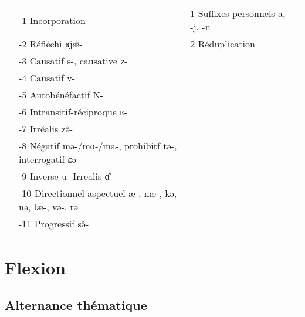\documentclass[11pt, a4paper]{book}              %
\newcommand{\ipa}[1]{{\phon \mbox{#1}}} %
\begin{document}
\begin{table}[H]
{\begin{tabular}{rrrrrrrrrrrrrrrrr}
 	          & \multicolumn{11}{l}{-1 Incorporation}                                                 & \multicolumn{4}{l}{1 Suffixes personnels a, -j, -n} &  \\
 	          & \multicolumn{11}{l}{-2 Réfléchi \ipa{ʁjæ̂-} }                                               & \multicolumn{4}{l}{2 Réduplication} &  \\
 	          & \multicolumn{11}{l}{-3 Causatif \ipa{s-}, causative \ipa{z-} }                                                 & \multicolumn{4}{l}{}          &  \\
 	          & \multicolumn{11}{l}{-4 Causatif \ipa{v-} }                                                 & \multicolumn{4}{l}{}          &  \\
 	          & \multicolumn{11}{l}{-5 Autobénéfactif \ipa{N-} }                                           & \multicolumn{4}{l}{}          &  \\
 	          & \multicolumn{11}{l}{-6 Intransitif-réciproque \ipa{ʁ-} }                                    & \multicolumn{4}{l}{}          &  \\
 	          & \multicolumn{11}{l}{-7 Irréalis \ipa{zə̂-}}                                                  & \multicolumn{4}{l}{}          &  \\
 	          & \multicolumn{11}{l}{-8 Négatif \ipa{mə-}/\ipa{mɑ-}/\ipa{ma-}, prohibitf \ipa{tə-}, interrogatif \ipa{ɕə}}       & \multicolumn{4}{r}{}          &  \\
 	          & \multicolumn{11}{l}{-9 Inverse \ipa{u-} Irrealis \ipa{ɑ̂-}}                                       & \multicolumn{4}{r}{}          &  \\
 	          & \multicolumn{11}{l}{-10 Directionnel-aspectuel \ipa{æ-}, \ipa{næ-}, \ipa{kə}, \ipa{nə}, \ipa{læ-}, \ipa{və-}, \ipa{rə}}         & \multicolumn{4}{r}{}          &  \\
 	          & \multicolumn{11}{l}{-11 Progressif \ipa{sə̂-}}                                             & \multicolumn{4}{r}{}          &  \\
 	    \bottomrule
 	    \end{tabular}
 }
 	\end{table}


\chapter{Flexion}

\section{Alternance thématique}
\end{document}
